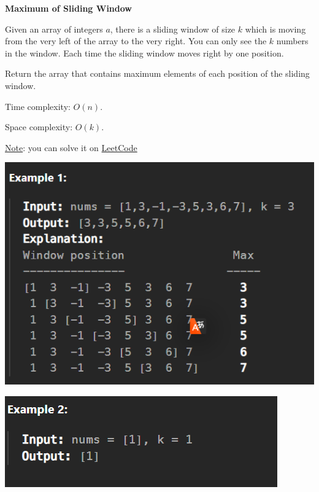 
\begin{problem}\textbf{Maximum of Sliding Window}

    Given an array of integers $a$, there is a sliding window of size $k$ which is moving from the very left of the array to the very right. You can only see the $k$ numbers in the window. Each time the sliding window moves right by one position.

    Return the array that contains maximum elements of each position of the sliding window.

    Time complexity: $O(n)$.

    Space complexity: $O(k)$.\newline

    \underline{Note}: you can solve it on \href{https://leetcode.com/problems/sliding-window-maximum/description/}{LeetCode}

    \includegraphics[scale=0.6]{./assets/05-basic-data-structures/1-1.PNG}

    \includegraphics[scale=0.6]{./assets/05-basic-data-structures/1-2.PNG}

\end{problem}


